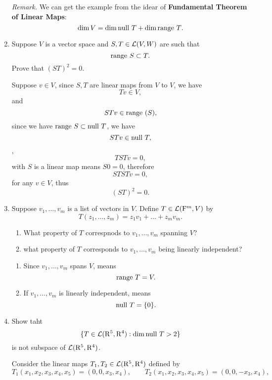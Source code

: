 \begin{enumerate}
\begin{solution}
            \textit{Remark.} We can get the example from the idear of \textbf{Fundamental Theorem of Linear Maps}:
            \[ \dim{V} = \dim{\text{null}~T} + \dim{\text{range}~T}. \]
        \end{solution}
    \item Suppose $V$ is a vector space and $S, T \in \mathcal{L}(V, W)$ are such that 
        \[ \range{S} \subset \null{T} .\]
        Prove that $(ST)^2 = 0$.
        \begin{solution}
            Suppose $v \in V$, since $S, T$ are linear maps from $V$ to $V$, we have 
            \[ Tv \in V ,\]
            and 
            \[ STv \in \text{range}~(S) ,\]
            since we have $\text{range}~S \subset \text{null}~T$, we have 
            \[ STv \in \text{null}~T ,\]
            \ie,
            \[ TSTv = 0, \]
            with $S$ is a linear map means $S0 = 0$, therefore 
            \[ STSTv = 0, \]
            for any $v \in V$, thus 
            \[ (ST)^2 = 0. \]
        \end{solution}
    \item Suppose $v_1, \ldots, v_m$ is a list of vectors in $V$. Define $T \in \mathcal{L}(\mathrm{F}^m, V)$ by 
        \[ T(z_1, \ldots, z_m) = z_1v_1 + \dots + z_mv_m .\]
        \begin{enumerate}[label=(\alph*)]
            \item What property of $T$ correspnods to $v_1, \ldots, v_m$ spanning $V$?
            \item what property of $T$ corresponds to $v_1, \ldots, v_m$ being linearly independent?
        \end{enumerate}
        \begin{solution}
            \begin{enumerate}[label=(\alph*)]
                \item Since $v_1, \ldots, v_m$ spans $V$, means 
                    \[ \text{range}~T = V .\]
                \item If $v_1, \ldots, v_m$ is linearly independent, means 
                    \[ \text{null}~T = \{0\} .\]
            \end{enumerate}
        \end{solution}
    \item Show taht 
        \[ \{T \in \mathcal{L}(\mathrm{R}^5, \mathrm{R}^4): \dim{\text{null}~T} > 2 \} \]
        is not subspace of $\mathcal{L}(\mathrm{R}^5, \mathrm{R}^4)$.
        \begin{solution}
            Consider the linear maps $T_1, T_2 \in \mathcal{L}(\mathrm{R}^5, \mathrm{R}^4)$ defined by 
            \[ T_1(x_1, x_2, x_3, x_4, x_5) = (0,0,x_3,x_4),\qquad T_2(x_1,x_2,x_3,x_4,x_5) = (0,0,-x_3,x_4) ,\]

\end{solution}
\end{enumerate}
